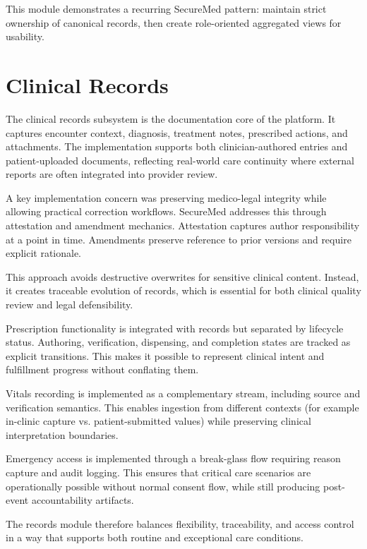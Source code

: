 This module demonstrates a recurring SecureMed pattern: maintain strict ownership of canonical records, then create role-oriented aggregated views for usability.

\section{Clinical Records}\label{56-clinical-records}

The clinical records subsystem is the documentation core of the platform. It captures encounter context, diagnosis, treatment notes, prescribed actions, and attachments. The implementation supports both clinician-authored entries and patient-uploaded documents, reflecting real-world care continuity where external reports are often integrated into provider review.

A key implementation concern was preserving medico-legal integrity while allowing practical correction workflows. SecureMed addresses this through attestation and amendment mechanics. Attestation captures author responsibility at a point in time. Amendments preserve reference to prior versions and require explicit rationale.

This approach avoids destructive overwrites for sensitive clinical content. Instead, it creates traceable evolution of records, which is essential for both clinical quality review and legal defensibility.

Prescription functionality is integrated with records but separated by lifecycle status. Authoring, verification, dispensing, and completion states are tracked as explicit transitions. This makes it possible to represent clinical intent and fulfillment progress without conflating them.

Vitals recording is implemented as a complementary stream, including source and verification semantics. This enables ingestion from different contexts (for example in-clinic capture vs. patient-submitted values) while preserving clinical interpretation boundaries.

Emergency access is implemented through a break-glass flow requiring reason capture and audit logging. This ensures that critical care scenarios are operationally possible without normal consent flow, while still producing post-event accountability artifacts.

The records module therefore balances flexibility, traceability, and access control in a way that supports both routine and exceptional care conditions.

